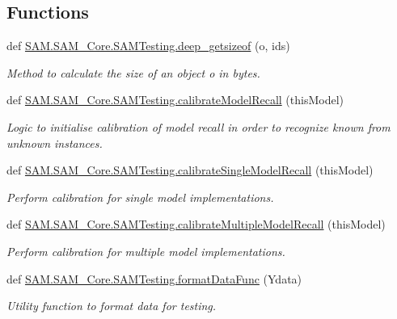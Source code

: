 \subsection*{Functions}
\begin{DoxyCompactItemize}
\item 
def \hyperlink{group__icubclient__SAM__Tests_ga4030a4fb35c568869122103d29b6cc25}{S\+A\+M.\+S\+A\+M\+\_\+\+Core.\+S\+A\+M\+Testing.\+deep\+\_\+getsizeof} (o, ids)
\begin{DoxyCompactList}\small\item\em Method to calculate the size of an object {\ttfamily o} in bytes. \end{DoxyCompactList}\item 
def \hyperlink{group__icubclient__SAM__Tests_ga451f7ba20c084a7482fc4bab4ba0f59d}{S\+A\+M.\+S\+A\+M\+\_\+\+Core.\+S\+A\+M\+Testing.\+calibrate\+Model\+Recall} (this\+Model)
\begin{DoxyCompactList}\small\item\em Logic to initialise calibration of model recall in order to recognize known from unknown instances. \end{DoxyCompactList}\item 
def \hyperlink{group__icubclient__SAM__Tests_ga9c6b9bfe733e2ff320995ec7e0ee9cdf}{S\+A\+M.\+S\+A\+M\+\_\+\+Core.\+S\+A\+M\+Testing.\+calibrate\+Single\+Model\+Recall} (this\+Model)
\begin{DoxyCompactList}\small\item\em Perform calibration for single model implementations. \end{DoxyCompactList}\item 
def \hyperlink{group__icubclient__SAM__Tests_ga609a55c3b5bbf9ab1f9759c240aefd8e}{S\+A\+M.\+S\+A\+M\+\_\+\+Core.\+S\+A\+M\+Testing.\+calibrate\+Multiple\+Model\+Recall} (this\+Model)
\begin{DoxyCompactList}\small\item\em Perform calibration for multiple model implementations. \end{DoxyCompactList}\item 
def \hyperlink{group__icubclient__SAM__Tests_ga5edddf8683ce4a2650429c355e4dd7dd}{S\+A\+M.\+S\+A\+M\+\_\+\+Core.\+S\+A\+M\+Testing.\+format\+Data\+Func} (Ydata)
\begin{DoxyCompactList}\small\item\em Utility function to format data for testing. \end{DoxyCompactList}\item 

\end{DoxyCompactItemize}
